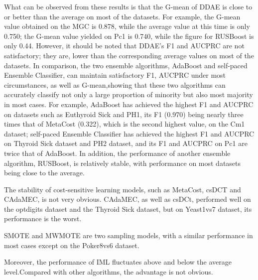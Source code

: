 What can be observed from these results is that the G-mean of DDAE is close to or better than the average on most of the datasets. For example, the G-mean value obtained on the MGC is 0.878, while the average value at this time is only 0.750; the G-mean value yielded on Pc1 is 0.740, while the figure for RUSBoost is only 0.44. However, it should be noted that DDAE's F1 and AUCPRC are not satisfactory; they are, lower than the corresponding average values on most of the datasets. In comparison, the two ensemble algorithms, AdaBoost and self-paced Ensemble Classifier, can maintain satisfactory F1, AUCPRC under most circumstances, as well as G-mean,showing that these two algorithms can accurately classify not only a large proportion of minority but also most majority in most cases. For example, AdaBoost has achieved the highest F1 and AUCPRC on datasets such as Euthyroid Sick and PH1, its F1 (0.970) being nearly three times that of MetaCost (0.322), which is the second highest value, on the Cm1 dataset; self-paced Ensemble Classifier has achieved the highest F1 and AUCPRC on Thyroid Sick dataset and PH2 dataset, and its F1 and AUCPRC on Pc1 are twice that of AdaBoost. In addition, the performance of another ensemble algorithm, RUSBoost, is relatively stable, with performance on most datasets being close to the average. 

The stability of cost-sensitive learning models, such as MetaCost, csDCT and CAdaMEC, is not very obvious. CAdaMEC, as well as csDCt, performed well on the optdigits dataset and the Thyroid Sick dataset, but on Yeast1vs7 dataset, its performance is the worst. 

SMOTE and MWMOTE are two sampling models, with a similar performance in most cases except on the Poker8vs6 dataset.

Moreover, the performance of IML fluctuates above and below the average level.Compared with other algorithms, the advantage is not obvious.


